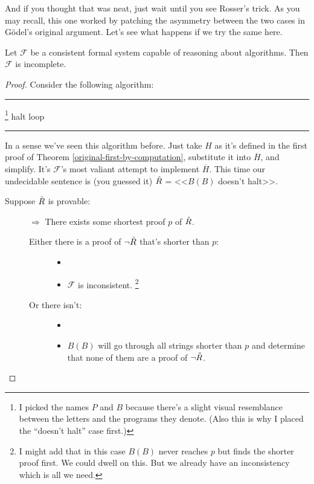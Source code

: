 \documentclass{article}
\theoremstyle{customstyle}
\newcommand{\F}{\ensuremath{\mathcal{F}}}
\newcommand{\iRosser}{\ensuremath{\accentset{\scalebox{0.35}{$\infty$}}{R}}}
\newenvironment{algo}{\begin{samepage}\medskip\hrule\begin{algorithmic}}{\end{algorithmic}\hrule\medskip\end{samepage}}
\begin{document}
And if you thought that was neat, just wait until you see Rosser's trick. As you may recall, this one worked by patching the asymmetry between the two cases in Gödel's original argument. Let's see what happens if we try the same here.

\begin{theorem}
Let $\F$ be a consistent formal system capable of reasoning about algorithms. Then $\F$ is incomplete.
\end{theorem}

\begin{proof}
Consider the following algorithm:
\begin{algo}
\footnote{I picked the names $P$ and $B$ because there's a slight visual resemblance between the letters and the programs they denote. (Also this is why I placed the ``doesn't halt'' case first.)}
      \State halt
    \EndIf
      \State loop
    \EndIf
  \EndFor
\EndFunction
\end{algo}
In a sense we've seen this algorithm before. Just take $H$ as it's defined in the first proof of Theorem \ref{original-first-by-computation}, substitute it into $\overline{H}$, and simplify. It's $\F$'s most valiant attempt to implement $\overline{H}$. This time our undecidable sentence is (you guessed it) $\iRosser$ = <<$B(B)$ doesn't halt>>.
\begin{description}
\item[Suppose $\iRosser$ is provable:]
$\Rightarrow$ There exists some shortest proof $p$ of $\iRosser$.
\begin{description}
\item[Either there is a proof of $\neg \iRosser$ that's shorter than $p$:]
\begin{itemize}
\item[]
\item $\F$ is inconsistent. \lightning\footnote{I might add that in this case $B(B)$ never reaches $p$ but finds the shorter proof first. We could dwell on this. But we already have an inconsistency which is all we need.}
\end{itemize}
\item[Or there isn't:]
\begin{itemize}
\item[]
\item $B(B)$ will go through all strings shorter than $p$ and determine that none of them are a proof of $\neg \iRosser$.

\end{itemize}
\end{description}
\end{description}
\end{proof}
\end{document}
